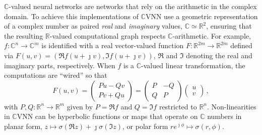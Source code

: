 \documentclass[a4paper,10pt,twocolumn]{article}
\newcommand{\real}{\mathbb{R}}
\newcommand{\cplx}{\mathbb{C}}
\newcommand{\iu}{{\jmath}}
\begin{document}
$\cplx$-valued neural networks are networks that rely on the arithmetic in the complex
domain. To achieve this implementations of $\cplx$VNN use a geometric representation
of a complex number as paired \emph{real} and \emph{imaginary} values, $\cplx \simeq \real^2$,
ensuring that the resulting $\real$-valued computational graph respects $\cplx$-arithmetic.
For example, $
  f\colon \cplx^n \to \cplx^m
$ is identified with a real vector-valued function $
  F\colon \real^{2 m} \to \real^{2 m}
$ defined via $
  F(u, v) = (\Re f(u + \iu v), \Im f(u + \iu v))
$, $\Re$ and $\Im$ denoting the real and imaginary parts, respectively. When $f$ is
a $\cplx$-valued linear transformation, the computations are ``wired'' so that
\begin{equation}  \label{eq:cplx-lin-op}
  F(u, v)
    =
    \begin{pmatrix}
      P u - Q v \\
      P v + Q u
    \end{pmatrix}
    = \begin{pmatrix}
      P & - Q \\ Q & P
    \end{pmatrix} \begin{pmatrix}
      u \\ v
    \end{pmatrix}
    \,,
\end{equation}
with $
  P, Q \colon \real^{n} \to \real^{m}
$ given by $P = \Re f$ and $Q = \Im f$ restricted to $\real^{n}$.
%
Non-linearities in $\cplx$VNN can be hyperbolic functions or maps that operate on
$\cplx$ numbers in planar form, $
  z \mapsto \sigma(\Re{z}) + \iu \sigma(\Im{z}) %
$, or polar form $
  r e^{\iu \phi} \mapsto \sigma(r, \phi)
$.
\end{document}

